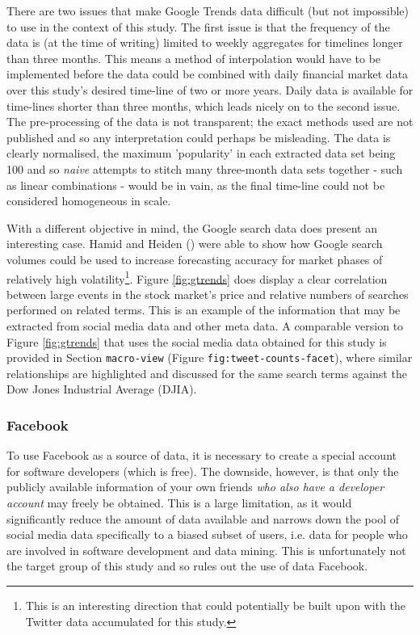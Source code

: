 \documentclass{article}
\begin{document}
There are two issues that make Google Trends data difficult (but not impossible) to use in the context of this study. The first issue is that the frequency of the data is (at the time of writing) limited to weekly aggregates for timelines longer than three months. This means a method of interpolation would have to be implemented before the data could be combined with daily financial market data over this study's desired time-line of two or more years. Daily data is available for time-lines shorter than three months, which leads nicely on to the second issue. The pre-processing of the data is not transparent; the exact methods used are not published and so any interpretation could perhaps be misleading. The data is clearly normalised, the maximum 'popularity' in each extracted data set being 100 and so \emph{naive} attempts to stitch many three-month data sets together - such as linear combinations - would be in vain, as the final time-line could not be considered homogeneous in scale.

With a different objective in mind, the Google search data does present an interesting case. Hamid and Heiden (\cite{hamid2015forecasting}) were able to show how Google search volumes could be used to increase forecasting accuracy for market phases of relatively high volatility\footnote{This is an interesting direction that could potentially be built upon with the Twitter data accumulated for this study.}. Figure \ref{fig:gtrends} does display a clear correlation between large events in the stock market's price and relative numbers of searches performed on related terms. This is an example of the information that may be extracted from social media data and other meta data. A comparable version to Figure \ref{fig:gtrends} that uses the social media data obtained for this study is provided in Section \texttt{macro-view} (Figure \texttt{fig:tweet-counts-facet}), where similar relationships are highlighted and discussed for the same search terms against the Dow Jones Industrial Average (DJIA).


\subsubsection{Facebook}
\label{sec-1-1-2}
To use Facebook as a source of data, it is necessary to create a special account for software developers (which is free). The downside, however, is that only the publicly available information of your own friends \emph{who also have a developer account} may freely be obtained. This is a large limitation, as it would significantly reduce the amount of data available and narrows down the pool of social media data specifically to a biased subset of users, i.e. data for people who are involved in software development and data mining. This is unfortunately not the target group of this study and so rules out the use of data Facebook.
\end{document}

